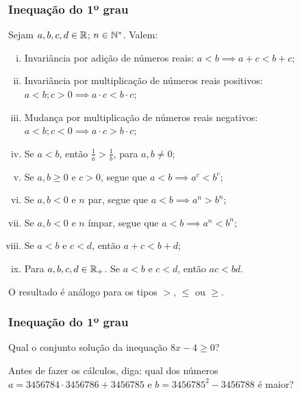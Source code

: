 \documentclass[brazil, notheorems, 10pt]{beamer}
\begin{document}
\begin{frame}
\frametitle{Inequação do 1º grau} %

\begin{Prop}
Sejam $a, b, c, d \in \mathbb{R}$; $n \in \mathbb{N}^*$. Valem:
\begin{enumerate}[i.]
	\item Invariância por adição de números reais: $a < b \implies a+c < b+c$;
	\item Invariância por multiplicação de números reais positivos:
	$a < b ; c>0 \implies a \cdot c < b \cdot c$;
	\item Mudança por multiplicação de números reais
	negativos: $a < b ; c<0 \implies a \cdot c > b \cdot c$;
	\item Se $a < b$, então $\frac 1 a > \frac 1 b$, para $a, b \neq
	0$;
	\item Se $a,b \geq 0$ e $c>0$, segue que $a < b \implies a^c < b^c$;
	\item Se $a,b < 0$ e $n$ par, segue que $a < b \implies a^n > b^n$;
	\item Se $a,b < 0$ e $n$ ímpar, segue que $a < b \implies a^n <
	b^n$;
	\item Se $a< b$ e $c< d$, então $a+c < b+d$;
	\item Para $a, b, c, d \in \mathbb{R}_+$. Se $a< b$ e $c< d$, então $ac < bd$.
\end{enumerate}
O resultado é análogo para os tipos $>$, $\leq$ ou $\geq$.
\end{Prop}


\end{frame}


\begin{frame}
\frametitle{Inequação do 1º grau} %

\begin{Exem}
Qual o conjunto solução da inequação $8x - 4 \geq 0$?
\end{Exem}

\begin{Exem}
Antes de fazer os cálculos, diga: qual dos números $a = 3456784
\cdot 3456786 + 3456785$ e $b = 3456785^2 - 3456788$ é maior?
\end{Exem}

\end{frame}
\end{document}

